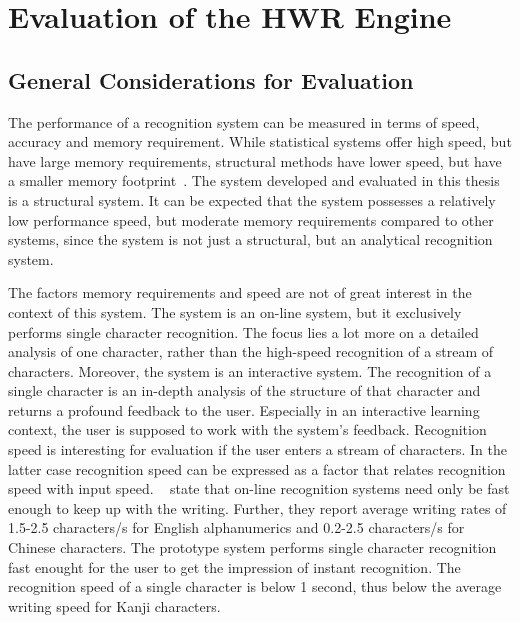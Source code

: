 \section{Evaluation of the HWR Engine}
\label{sec:eval:hwreval}

\subsection{General Considerations for Evaluation}
\label{sec:eval:generalconsiderations}

The performance of a recognition system can be measured in terms of speed,
accuracy and memory requirement.
While statistical systems offer high speed, 
but have large memory requirements,
structural methods have lower speed, but have a smaller 
memory footprint~.
The system developed and evaluated in this thesis is a structural system.
It can be expected that the system possesses a relatively low performance speed,
but moderate memory requirements compared to other systems,
since the system is not just a structural, but an analytical
recognition system.

The factors memory requirements and speed are not of great interest in
the context of this system. The system is an on-line system, but it
exclusively performs single character recognition. The focus lies a lot more on
a detailed analysis of one character, rather than the high-speed recognition
of a stream of characters. Moreover, the system is an interactive system. 
The recognition of a single character is an in-depth analysis of the
structure of that character and returns a profound feedback to the user.
Especially in an interactive learning context, the user is supposed to
work with the system's feedback. Recognition speed is interesting for evaluation
if the user enters a stream of characters. In the latter case recognition speed
can be expressed as a factor that relates recognition speed with input speed.
~\citeyear{Tappert1990} state that on-line
recognition systems need only be fast enough to keep up with the writing. 
Further, they report average writing rates of  1.5-2.5  characters/s  for 
English  alphanumerics  and 0.2-2.5  characters/s  for  Chinese  characters.  
The prototype system performs single character recognition fast enought
for the user to get the impression of instant recognition. 
The recognition speed of a single character is below 1 second, 
thus below the average writing speed for Kanji characters. 

